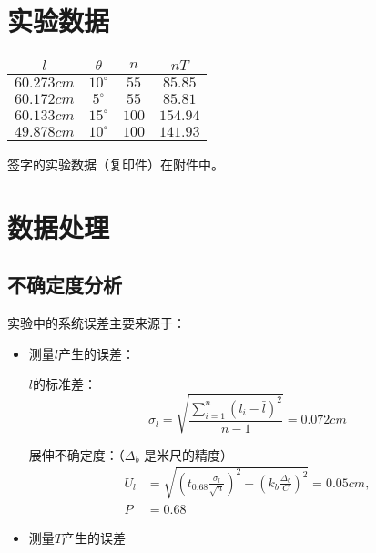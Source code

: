 \documentclass[a4paper]{ltxdoc}
\begin{document}
\begin{multicols}{2}
  \section[实验数据]{实验数据}
  \begin{tabular}{|c|c|c|c|}
    \hline\textbf{$l$} & \textbf{$\theta$} & \textbf{$n$} & \textbf{$nT$} \\
    \hline $60.273cm$  & $10^{\circ}$      & $55$         & $85.85$       \\
    \hline $60.172cm$  & $5^{\circ}$       & $55$         & $85.81$       \\
    \hline $60.133cm$  & $15^{\circ}$      & $100$        & $154.94$      \\
    \hline $49.878cm$  & $10^{\circ}$      & $100$        & $141.93$      \\
    \hline
  \end{tabular}

  \bigskip
  签字的实验数据（复印件）在附件中。
  \section{数据处理}
  \subsection{不确定度分析}

  实验中的系统误差主要来源于：
  \begin{itemize}
    \item 测量$l$产生的误差：

          $l$的标准差：
          $$
            \sigma_l = \sqrt{\frac {\sum _{i=1}^{n} (l_i - \bar l)^2} {n-1} }= 0.072 cm
          $$

          展伸不确定度：（$\Delta_b$ 是米尺的精度）
          $$
            \begin{aligned}
              U_l & =\sqrt{(t_{0.68} \frac {\sigma _l} {\sqrt{n}})^2 + (k_b \frac {\Delta_b} {C})^2} = 0.05 cm, \\
              P   & =0.68
            \end{aligned}
          $$
    \item 测量$T$产生的误差


\end{itemize}
\end{multicols}
\end{document}
